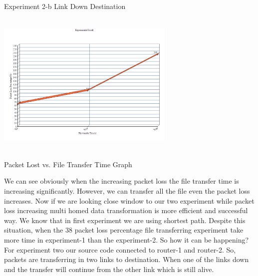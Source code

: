 \documentclass[letterpaper, 12 pt, conference]{ieeeconf}  %
\begin{document}
\begin{center}
Experiment 2-b Link Down Destination
\end{center}



\includegraphics[width=8.5cm, height=7cm]{Graph.png}

\begin{center}
Packet Lost vs. File Transfer Time Graph
\end{center}

\vspace{5cm}

We can see obviously when the increasing packet loss the file transfer time is increasing significantly. However, we can transfer all the file even the packet loss increases. Now if we are looking close window to our two experiment while packet loss increasing multi homed data transformation is more efficient and successful way. We know that in first experiment we are using shortest path. Despite this situation, when the 38 packet loss percentage file transferring experiment take more time in experiment-1 than the experiment-2. So how it can be happening? For experiment two our source code connected to router-1 and router-2. So, packets are transferring in two links to destination. When one of the links down and the transfer will continue from the other link which is still alive. 
\end{document}

